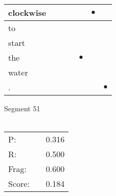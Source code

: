 \documentclass[landscape]{article}
\newcommand{\ssp}{\hspace{2pt}}
\newcommand{\mex}{\cellcolor{g}$\bullet$}
\begin{document}
\begin{tabular}{|l|p{10pt}|p{10pt}|p{10pt}|p{10pt}|p{10pt}|p{10pt}|}
\hline
\ssp \cellcolor{ref4}clockwise \ssp&\hspace{2pt}&\hspace{2pt}&\hspace{2pt}&\hspace{2pt}&\hspace{2pt}\mex&\hspace{2pt}\\
\hline
\ssp to \ssp&\hspace{2pt}&\hspace{2pt}&\hspace{2pt}&\hspace{2pt}&\hspace{2pt}&\hspace{2pt}\\
\hline
\ssp start \ssp&\hspace{2pt}&\hspace{2pt}&\hspace{2pt}&\hspace{2pt}&\hspace{2pt}&\hspace{2pt}\\
\hline
\ssp \cellcolor{ref3}the \ssp&\hspace{2pt}&\hspace{2pt}&\hspace{2pt}&\hspace{2pt}\mex&\hspace{2pt}&\hspace{2pt}\\
\hline
\ssp water \ssp&\hspace{2pt}&\hspace{2pt}&\hspace{2pt}&\hspace{2pt}&\hspace{2pt}&\hspace{2pt}\\
\hline
\ssp \cellcolor{ref5}. \ssp&\hspace{2pt}&\hspace{2pt}&\hspace{2pt}&\hspace{2pt}&\hspace{2pt}&\hspace{2pt}\mex\\
\hline
\end{tabular}

\vspace{6pt}
\noindent Segment 51\\\\
\noindent\begin{tabular}{lm{12pt}r}
\hline
P:&&0.316\\
R:&&0.500\\
Frag:&&0.600\\
Score:&&0.184\\
\end{tabular}
\end{document}

